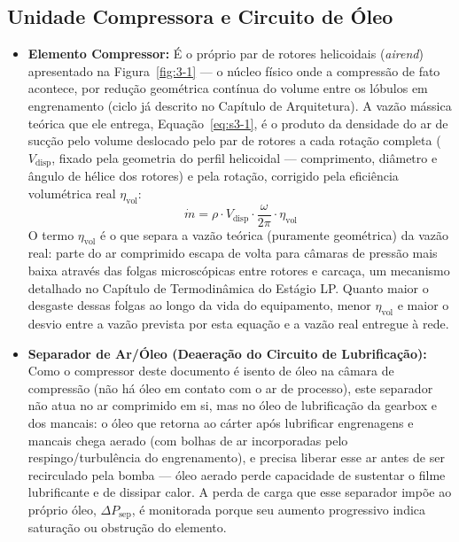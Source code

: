\documentclass[12pt,a4paper]{article}
\numberwithin{equation}{section}
\numberwithin{table}{section}
\numberwithin{figure}{section}
\begin{document}
{	\subsection{\textbf{Unidade Compressora e Circuito de Óleo}}
	\begin{itemize}
		\item \textbf{Elemento Compressor:} É o próprio par de rotores helicoidais (\textit{airend}) apresentado na Figura~\ref{fig:3-1} — o núcleo físico onde a compressão de fato acontece, por redução geométrica contínua do volume entre os lóbulos em engrenamento (ciclo já descrito no Capítulo de Arquitetura). A vazão mássica teórica que ele entrega, Equação~\eqref{eq:s3-1}, é o produto da densidade do ar de sucção pelo volume deslocado pelo par de rotores a cada rotação completa ($V_{\text{disp}}$, fixado pela geometria do perfil helicoidal — comprimento, diâmetro e ângulo de hélice dos rotores) e pela rotação, corrigido pela eficiência volumétrica real $\eta_{\text{vol}}$:
		\begin{equation}\label{eq:s3-1}
 \dot{m} = \rho \cdot V_{\text{disp}} \cdot \frac{\omega}{2\pi} \cdot \eta_{\text{vol}}
\end{equation}
		O termo $\eta_{\text{vol}}$ é o que separa a vazão teórica (puramente geométrica) da vazão real: parte do ar comprimido escapa de volta para câmaras de pressão mais baixa através das folgas microscópicas entre rotores e carcaça, um mecanismo detalhado no Capítulo de Termodinâmica do Estágio LP. Quanto maior o desgaste dessas folgas ao longo da vida do equipamento, menor $\eta_{\text{vol}}$ e maior o desvio entre a vazão prevista por esta equação e a vazão real entregue à rede.
		\item \textbf{Separador de Ar/Óleo (Deaeração do Circuito de Lubrificação):} Como o compressor deste documento é isento de óleo na câmara de compressão (não há óleo em contato com o ar de processo), este separador não atua no ar comprimido em si, mas no óleo de lubrificação da gearbox e dos mancais: o óleo que retorna ao cárter após lubrificar engrenagens e mancais chega aerado (com bolhas de ar incorporadas pelo respingo/turbulência do engrenamento), e precisa liberar esse ar antes de ser recirculado pela bomba — óleo aerado perde capacidade de sustentar o filme lubrificante e de dissipar calor. A perda de carga que esse separador impõe ao próprio óleo, $\Delta P_{\text{sep}}$, é monitorada porque seu aumento progressivo indica saturação ou obstrução do elemento.
	\end{itemize}
	
}
\end{document}
